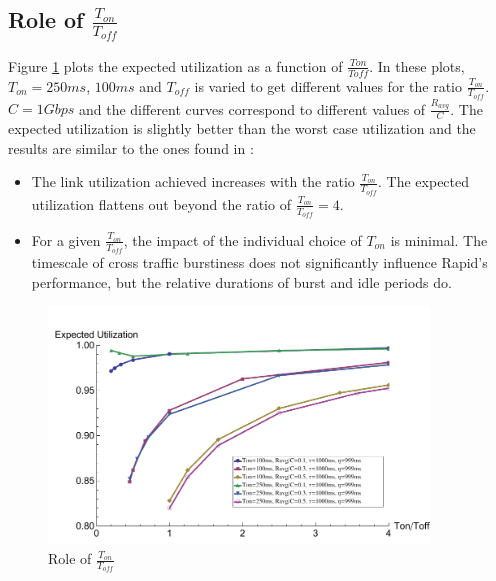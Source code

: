   \subsection{Role of $\frac{T_{on}}{T_{off}}$}
    Figure \ref{rtttontoff} plots the expected utilization as a function of 
    $\frac{Ton}{Toff}$. In these plots, $T_{on} = 250ms$, $100ms$ and 
    $T_{off}$ is varied to get different values for the ratio 
    $\frac{T_{on}}{T_{off}}$. $C = 1Gbps$ and the different curves correspond 
    to different values of $\frac{R_{avg}}{C}$. The expected utilization is 
    slightly better than the worst case utilization and the results are 
    similar to the ones found in \cite{Lovewell2011-Noise-TR}:
    \begin{itemize}
      \item The link utilization achieved increases with the ratio 
      $\frac{T_{on}}{T_{off}}$. The expected utilization flattens out beyond 
      the ratio of $\frac{T_{on}}{T_{off}} = 4$.
      \item For a given $\frac{T_{on}}{T_{off}}$, the impact of the 
      individual choice of $T_{on}$ is minimal. The timescale of cross traffic 
      burstiness does not significantly influence Rapid's performance, but the 
      relative durations of burst and idle periods do.
    \end{itemize}
    \begin{figure}[!htb]
      \centering
      \includegraphics[width=0.9\textwidth]{img/rtttontoff.pdf}
      \caption{Role of $\frac{T_{on}}{T_{off}}$}
      \label{rtttontoff}
    \end{figure}

